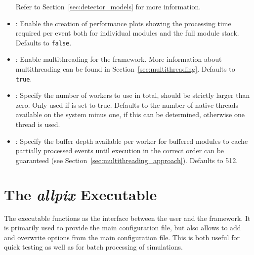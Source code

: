 \begin{itemize}
Refer to Section~\ref{sec:detector_models} for more information.
\item {}: Enable the creation of performance plots showing the processing time required per event both for individual modules and the full module stack. Defaults to \texttt{false}.
\item {}: Enable multithreading for the framework. More information about multithreading can be found in Section~\ref{sec:multithreading}. Defaults to \texttt{true}.
\item {}: Specify the number of workers to use in total, should be strictly larger than zero. Only used if  is set to true. Defaults to the number of native threads available on the system minus one, if this can be determined, otherwise one thread is used.
\item {}: Specify the buffer depth available per worker for buffered modules to cache partially processed events until execution in the correct order can be guaranteed (see Section~\ref{sec:multithreading_approach}). Defaults to 512.
\end{itemize}

\section{The \textit{allpix} Executable}
\label{sec:allpix_executable}
The  executable functions as the interface between the user and the framework. It is primarily used to provide the main configuration file, but also allows to add and overwrite options from the main configuration file. This is both useful for quick testing as well as for batch processing of simulations.

